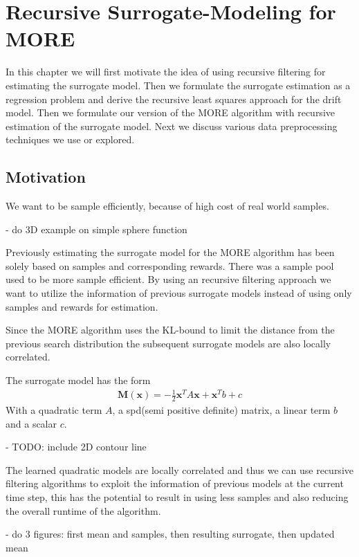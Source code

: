 
\chapter{Recursive Surrogate-Modeling for MORE}
In this chapter we will first motivate the idea of using recursive filtering
for estimating the surrogate model. Then we formulate the surrogate estimation
as a regression problem and derive the recursive
least squares approach for the drift model.
Then we formulate our version of the MORE algorithm with
recursive estimation of the surrogate model.
Next we discuss various data preprocessing techniques we use or explored.

\section{Motivation}
We want to be sample efficiently, because of high cost of real world samples.

- do 3D example on simple sphere function

Previously estimating the surrogate model for the MORE algorithm has been solely based
on samples and corresponding rewards. There was a sample pool used to be more
sample efficient. By using an recursive filtering approach
we want to utilize the information of previous surrogate models instead
of using only samples and rewards for estimation.

Since the MORE algorithm uses the KL-bound to limit the distance from the previous search
distribution the subsequent surrogate models are also locally correlated.

The surrogate model has the form
\begin{align}
  \label{surrogate}
  \mathbf{M}(\mathbf{x}) = -\frac{1}{2} \mathbf{x}^T A \mathbf{x}
  + \mathbf{x}^T b + c 
\end{align}
With a quadratic term $A$, a spd(semi positive definite) matrix, a
linear term $b$ and a scalar $c$.

- TODO: include 2D contour line

The learned quadratic models are locally correlated and thus we can use recursive
filtering algorithms to exploit the information of previous models at
the current time step, this has the potential to result in using less samples
and also reducing the overall runtime of the algorithm.

- do 3 figures: first mean and samples, then resulting surrogate, then updated mean


